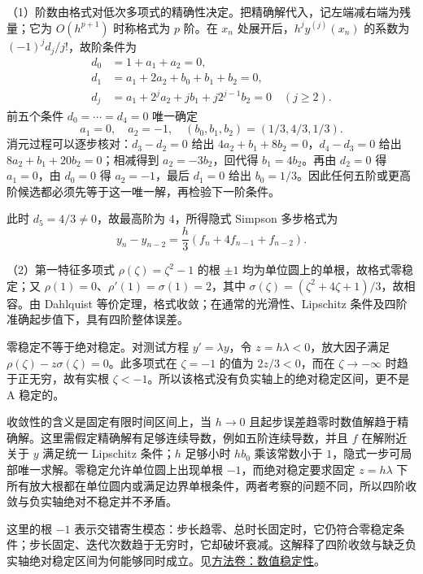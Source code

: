 \documentclass[UTF8,12pt,a4paper,fontset=fandol]{ctexart}
\begin{document}
\begin{solve}\label{ans:fin12-high:13}

（1）阶数由格式对低次多项式的精确性决定。把精确解代入，记左端减右端为残量；它为 $O(h^{p+1})$ 时称格式为 $p$ 阶。在 $x_n$ 处展开后，$h^jy^{(j)}(x_n)$ 的系数为 $(-1)^jd_j/j!$，故阶条件为
\[
\begin{aligned}
d_0&=1+a_1+a_2=0,\\
d_1&=a_1+2a_2+b_0+b_1+b_2=0,\\
d_j&=a_1+2^ja_2+jb_1+j2^{j-1}b_2=0\quad(j\geq2).
\end{aligned}
\]
前五个条件 $d_0=\cdots=d_4=0$ 唯一确定
\[
a_1=0,\quad a_2=-1,\quad(b_0,b_1,b_2)=(1/3,4/3,1/3).
\]
消元过程可以逐步核对：$d_3-d_2=0$ 给出 $4a_2+b_1+8b_2=0$，$d_4-d_3=0$ 给出 $8a_2+b_1+20b_2=0$；相减得到 $a_2=-3b_2$，回代得 $b_1=4b_2$。再由 $d_2=0$ 得 $a_1=0$，由 $d_0=0$ 得 $a_2=-1$，最后 $d_1=0$ 给出 $b_0=1/3$。因此任何五阶或更高阶候选都必须先等于这一唯一解，再检验下一阶条件。

此时 $d_5=4/3\ne0$，故最高阶为 $4$，所得隐式 Simpson 多步格式为
\[
y_n-y_{n-2}=\frac h3(f_n+4f_{n-1}+f_{n-2}).
\]

（2）第一特征多项式 $\rho(\zeta)=\zeta^2-1$ 的根 $\pm1$ 均为单位圆上的单根，故格式零稳定；又 $\rho(1)=0$、$\rho'(1)=\sigma(1)=2$，其中 $\sigma(\zeta)=(\zeta^2+4\zeta+1)/3$，故相容。由 Dahlquist 等价定理，格式收敛；在通常的光滑性、Lipschitz 条件及四阶准确起步值下，具有四阶整体误差。

零稳定不等于绝对稳定。对测试方程 $y'=\lambda y$，令 $z=h\lambda<0$，放大因子满足 $\rho(\zeta)-z\sigma(\zeta)=0$。此多项式在 $\zeta=-1$ 的值为 $2z/3<0$，而在 $\zeta\to-\infty$ 时趋于正无穷，故有实根 $\zeta<-1$。所以该格式没有负实轴上的绝对稳定区间，更不是 A 稳定的。

收敛性的含义是固定有限时间区间上，当 $h\to0$ 且起步误差趋零时数值解趋于精确解。这里需假定精确解有足够连续导数，例如五阶连续导数，并且 $f$ 在解附近关于 $y$ 满足统一 Lipschitz 条件；$h$ 足够小时 $hb_0$ 乘该常数小于 $1$，隐式一步可局部唯一求解。零稳定允许单位圆上出现单根 $-1$，而绝对稳定要求固定 $z=h\lambda$ 下所有放大根都在单位圆内或满足边界单根条件，两者考察的问题不同，所以四阶收敛与负实轴绝对不稳定并不矛盾。

\end{solve}

\begin{remark}[方法与条件]这里的根 $-1$ 表示交错寄生模态：步长趋零、总时长固定时，它仍符合零稳定条件；步长固定、迭代次数趋于无穷时，它却破坏衰减。这解释了四阶收敛与缺乏负实轴绝对稳定区间为何能够同时成立。见\hyperref[app:dynamics-stability]{方法卷：数值稳定性}。\end{remark}
\end{document}

